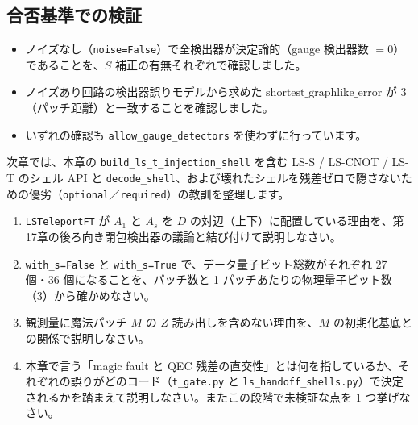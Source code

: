 \subsection*{合否基準での検証}

\begin{itemize}
  \item ノイズなし（\texttt{noise=False}）で全検出器が決定論的（gauge 検出器数 $=0$）であることを、$S$ 補正の有無それぞれで確認しました。
  \item ノイズあり回路の検出器誤りモデルから求めた $\mathrm{shortest\_graphlike\_error}$ が 3（パッチ距離）と一致することを確認しました。
  \item いずれの確認も \texttt{allow\_gauge\_detectors} を使わずに行っています。
\end{itemize}

次章では、本章の \texttt{build\_ls\_t\_injection\_shell} を含む LS-S / LS-CNOT / LS-T のシェル API と \texttt{decode\_shell}、および壊れたシェルを残差ゼロで隠さないための優劣（\texttt{optional}／\texttt{required}）の教訓を整理します。

\begin{exercise}
  \begin{enumerate}
    \item \texttt{LSTeleportFT} が $A_1$ と $A_s$ を $D$ の対辺（上下）に配置している理由を、第17章の後ろ向き閉包検出器の議論と結び付けて説明しなさい。
    \item \texttt{with\_s=False} と \texttt{with\_s=True} で、データ量子ビット総数がそれぞれ 27 個・36 個になることを、パッチ数と 1 パッチあたりの物理量子ビット数（3）から確かめなさい。
    \item 観測量に魔法パッチ $M$ の $Z$ 読み出しを含めない理由を、$M$ の初期化基底との関係で説明しなさい。
    \item 本章で言う「magic fault と QEC 残差の直交性」とは何を指しているか、それぞれの誤りがどのコード（\texttt{t\_gate.py} と \texttt{ls\_handoff\_shells.py}）で決定されるかを踏まえて説明しなさい。またこの段階で未検証な点を 1 つ挙げなさい。
  \end{enumerate}
\end{exercise}
